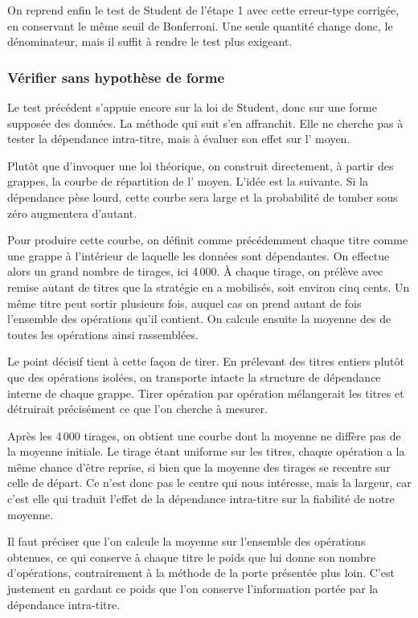 On reprend enfin le test de Student de l'étape 1 avec cette erreur-type
corrigée, en conservant le même seuil de Bonferroni. Une seule quantité change
donc, le dénominateur, mais il suffit à rendre le test plus exigeant.

\subsubsection*{Vérifier sans hypothèse de forme}

Le test précédent s'appuie encore sur la loi de Student, donc sur une forme
supposée des données. La méthode qui suit s'en affranchit. Elle ne cherche pas
à tester la dépendance intra-titre, mais à évaluer son effet sur l'\edgevar{}
moyen.

Plutôt que d'invoquer une loi théorique, on construit directement, à partir
des grappes, la courbe de répartition de l'\edgevar{} moyen. L'idée est la
suivante. Si la dépendance pèse lourd, cette courbe sera large et la
probabilité de tomber sous zéro augmentera d'autant.

Pour produire cette courbe, on définit comme précédemment chaque titre comme
une grappe à l'intérieur de laquelle les données sont dépendantes. On effectue
alors un grand nombre de tirages, ici 4\,000. À chaque tirage, on prélève avec
remise autant de titres que la stratégie en a mobilisés, soit environ cinq
cents. Un même titre peut sortir plusieurs fois, auquel cas on prend autant de
fois l'ensemble des opérations qu'il contient. On calcule ensuite la moyenne
des \edgevar{} de toutes les opérations ainsi rassemblées.

Le point décisif tient à cette façon de tirer. En prélevant des titres
entiers plutôt que des opérations isolées, on transporte intacte la structure
de dépendance interne de chaque grappe. Tirer opération par opération
mélangerait les titres et détruirait précisément ce que l'on cherche à
mesurer.

Après les 4\,000 tirages, on obtient une courbe dont la moyenne ne diffère pas
de la moyenne initiale. Le tirage étant uniforme sur les titres, chaque
opération a la même chance d'être reprise, si bien que la moyenne des tirages
se recentre sur celle de départ. Ce n'est donc pas le centre qui nous
intéresse, mais la largeur, car c'est elle qui traduit l'effet de la
dépendance intra-titre sur la fiabilité de notre moyenne.

Il faut préciser que l'on calcule la moyenne sur l'ensemble des opérations
obtenues, ce qui conserve à chaque titre le poids que lui donne son nombre
d'opérations, contrairement à la méthode de la porte présentée plus loin.
C'est justement en gardant ce poids que l'on conserve l'information portée par
la dépendance intra-titre.

